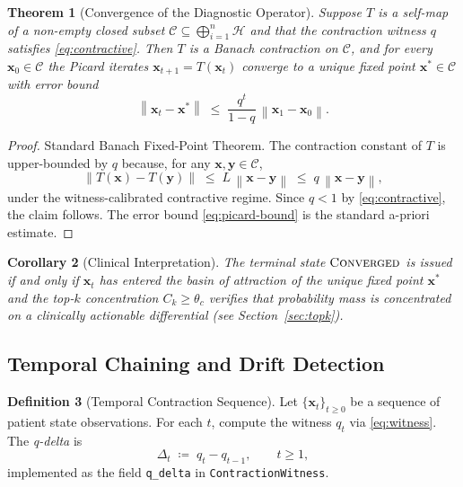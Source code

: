 \documentclass[11pt,a4paper]{article}
\theoremstyle{tealstyle}
\newtheorem{theorem}{Theorem}[section]
\newtheorem{corollary}[theorem]{Corollary}
\theoremstyle{definition}
\newtheorem{definition}[theorem]{Definition}
\newcommand{\Hilb}{\mathcal{H}}
\newcommand{\norm}[1]{\left\lVert #1 \right\rVert}
\newcommand{\topk}{C_k}
\newcommand{\qwit}{q}
\newcommand{\converged}{\textsc{Converged}}
\begin{document}
\begin{theorem}[Convergence of the Diagnostic Operator]
\label{thm:banach}
Suppose $T$ is a self-map of a non-empty closed subset
$\mathcal{C} \subseteq \bigoplus_{i=1}^n \Hilb$ and that the contraction
witness $\qwit$ satisfies \eqref{eq:contractive}.
Then $T$ is a Banach contraction on $\mathcal{C}$, and for every
$\bm{x}_0 \in \mathcal{C}$ the Picard iterates
$\bm{x}_{t+1} = T(\bm{x}_t)$ converge to a unique fixed point
$\bm{x}^* \in \mathcal{C}$ with error bound
\begin{equation}
  \label{eq:picard-bound}
  \norm{\bm{x}_t - \bm{x}^*}
  \;\le\; \frac{\qwit^t}{1 - \qwit}\,\norm{\bm{x}_1 - \bm{x}_0}.
\end{equation}
\end{theorem}

\begin{proof}
Standard Banach Fixed-Point Theorem.
The contraction constant of $T$ is upper-bounded by $\qwit$ because,
for any $\bm{x}, \bm{y} \in \mathcal{C}$,
\[
  \norm{T(\bm{x}) - T(\bm{y})}
  \;\le\; L\,\norm{\bm{x} - \bm{y}}
  \;\le\; \qwit\,\norm{\bm{x} - \bm{y}},
\]
under the witness-calibrated contractive regime.
Since $\qwit < 1$ by \eqref{eq:contractive}, the claim follows.
The error bound \eqref{eq:picard-bound} is the standard a-priori estimate.
\end{proof}

\begin{corollary}[Clinical Interpretation]
\label{cor:clinical}
The terminal state $\converged$ is \emph{issued if and only if}
$\bm{x}_t$ has entered the basin of attraction of the unique fixed point
$\bm{x}^*$ and the top-$k$ concentration $\topk \ge \theta_c$ verifies that
probability mass is concentrated on a clinically actionable differential
(see Section~\ref{sec:topk}).
\end{corollary}

\subsection{Temporal Chaining and Drift Detection}
\label{sec:temporal}

\begin{definition}[Temporal Contraction Sequence]
\label{def:temporal}
Let $\{\bm{x}_t\}_{t \ge 0}$ be a sequence of patient state observations.
For each $t$, compute the witness $\qwit_t$ via \eqref{eq:witness}.
The \emph{q-delta} is
\[
  \Delta_t \;\coloneqq\; \qwit_t - \qwit_{t-1},
  \qquad t \ge 1,
\]
implemented as the field \texttt{q\_delta} in \texttt{ContractionWitness}.
\end{definition}
\end{document}

